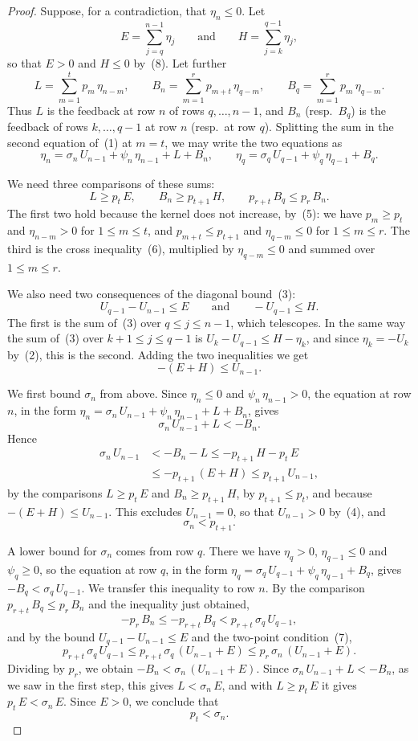 \documentclass{amsart}
\theoremstyle{definition}
\theoremstyle{remark}
\numberwithin{equation}{section}
\begin{document}
\begin{proof}
Suppose, for a contradiction, that $\eta_n\le 0$. Let
\[
E=\sum_{j=q}^{n-1}\eta_j\qquad\text{and}\qquad H=\sum_{j=k}^{q-1}\eta_j ,
\]
so that $E>0$ and $H\le 0$ by~(8). Let further
\[
L=\sum_{m=1}^{t}p_m\,\eta_{n-m},\qquad B_n=\sum_{m=1}^{r}p_{m+t}\,\eta_{q-m},\qquad B_q=\sum_{m=1}^{r}p_m\,\eta_{q-m}.
\]
Thus $L$ is the feedback at row $n$ of rows $q,\dots,n-1$, and $B_n$ (resp.\ $B_q$) is the feedback of rows $k,\dots,q-1$ at row $n$ (resp.\ at row $q$). Splitting the sum in the second equation of~(1) at $m=t$, we may write the two equations as
\[
\eta_n=\sigma_n\,U_{n-1}+\psi_n\,\eta_{n-1}+L+B_n,\qquad \eta_q=\sigma_q\,U_{q-1}+\psi_q\,\eta_{q-1}+B_q.
\]

We need three comparisons of these sums:
\[
L\ge p_t\,E,\qquad B_n\ge p_{t+1}\,H,\qquad p_{r+t}\,B_q\le p_r\,B_n.
\]
The first two hold because the kernel does not increase, by~(5): we have $p_m\ge p_t$ and $\eta_{n-m}>0$ for $1\le m\le t$, and $p_{m+t}\le p_{t+1}$ and $\eta_{q-m}\le 0$ for $1\le m\le r$. The third is the cross inequality~(6), multiplied by $\eta_{q-m}\le 0$ and summed over $1\le m\le r$.

We also need two consequences of the diagonal bound~(3):
\[
U_{q-1}-U_{n-1}\le E\qquad\text{and}\qquad -U_{q-1}\le H.
\]
The first is the sum of~(3) over $q\le j\le n-1$, which telescopes. In the same way the sum of~(3) over $k+1\le j\le q-1$ is $U_k-U_{q-1}\le H-\eta_k$, and since $\eta_k=-U_k$ by~(2), this is the second. Adding the two inequalities we get
\[
-(E+H)\le U_{n-1}.
\]

We first bound $\sigma_n$ from above. Since $\eta_n\le 0$ and $\psi_n\,\eta_{n-1}>0$, the equation at row $n$, in the form $\eta_n=\sigma_n\,U_{n-1}+\psi_n\,\eta_{n-1}+L+B_n$, gives
\[
\sigma_n\,U_{n-1}+L<-B_n.
\]
Hence
\begin{align*}
\sigma_n\,U_{n-1}&<-B_n-L\le -p_{t+1}\,H-p_t\,E\\
&\le -p_{t+1}\,(E+H)\le p_{t+1}\,U_{n-1},
\end{align*}
by the comparisons $L\ge p_t\,E$ and $B_n\ge p_{t+1}\,H$, by $p_{t+1}\le p_t$, and because $-(E+H)\le U_{n-1}$. This excludes $U_{n-1}=0$, so that $U_{n-1}>0$ by~(4), and
\[
\sigma_n<p_{t+1}.
\]

A lower bound for $\sigma_n$ comes from row $q$. There we have $\eta_q>0$, $\eta_{q-1}\le 0$ and $\psi_q\ge 0$, so the equation at row $q$, in the form $\eta_q=\sigma_q\,U_{q-1}+\psi_q\,\eta_{q-1}+B_q$, gives $-B_q<\sigma_q\,U_{q-1}$. We transfer this inequality to row $n$. By the comparison $p_{r+t}\,B_q\le p_r\,B_n$ and the inequality just obtained,
\[
-p_r\,B_n\le -p_{r+t}\,B_q<p_{r+t}\,\sigma_q\,U_{q-1},
\]
and by the bound $U_{q-1}-U_{n-1}\le E$ and the two-point condition~(7),
\[
p_{r+t}\,\sigma_q\,U_{q-1}\le p_{r+t}\,\sigma_q\,(U_{n-1}+E)\le p_r\,\sigma_n\,(U_{n-1}+E).
\] Dividing by $p_r$, we obtain $-B_n<\sigma_n\,(U_{n-1}+E)$. Since $\sigma_n\,U_{n-1}+L<-B_n$, as we saw in the first step, this gives $L<\sigma_n\,E$, and with $L\ge p_t\,E$ it gives $p_t\,E<\sigma_n\,E$. Since $E>0$, we conclude that
\[
p_t<\sigma_n.
\]


\end{proof}
\end{document}
